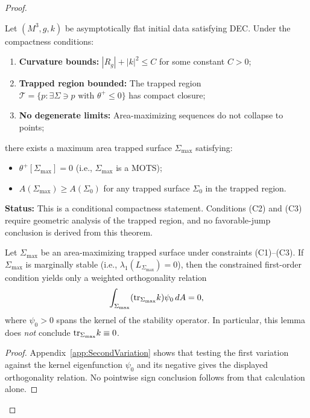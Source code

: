 \begin{proof}
\begin{theorem}\label{thm:MaxAreaTrapped}\label{rem:MaxAreaStatus}
Let $(M^3, g, k)$ be asymptotically flat initial data satisfying DEC. Under the compactness conditions:
\begin{enumerate}
    \item[\textup{(C1)}] \textbf{Curvature bounds:} $|R_g| + |k|^2 \le C$ for some constant $C > 0$;
    \item[\textup{(C2)}] \textbf{Trapped region bounded:} The trapped region $\mathcal{T} = \{p : \exists \Sigma \ni p \text{ with } \theta^+ \le 0\}$ has compact closure;
    \item[\textup{(C3)}] \textbf{No degenerate limits:} Area-maximizing sequences do not collapse to points;
\end{enumerate}
there exists a maximum area trapped surface $\Sigma_{\max}$ satisfying:
\begin{itemize}
    \item $\theta^+[\Sigma_{\max}] = 0$ (i.e., $\Sigma_{\max}$ is a MOTS);
    \item $A(\Sigma_{\max}) \ge A(\Sigma_0)$ for any trapped surface $\Sigma_0$ in the trapped region.
\end{itemize}
\textbf{Status:} This is a conditional compactness statement. Conditions (C2) and (C3) require geometric analysis of the trapped region, and no favorable-jump conclusion is derived from this theorem.
\end{theorem}

\begin{lemma}\label{lem:VanishingMultiplier}
Let $\Sigma_{\max}$ be an area-maximizing trapped surface under constraints (C1)--(C3). If $\Sigma_{\max}$ is marginally stable (i.e., $\lambda_1(L_{\Sigma_{\max}}) = 0$), then the constrained first-order condition yields only a weighted orthogonality relation
\[
    \int_{\Sigma_{\max}} (\mathrm{tr}_{\Sigma_{\max}} k)\psi_0\, dA = 0,
\]
where $\psi_0>0$ spans the kernel of the stability operator. In particular, this lemma does \emph{not} conclude $\mathrm{tr}_{\Sigma_{\max}} k \equiv 0$.
\end{lemma}
\begin{proof}
Appendix~\ref{app:SecondVariation} shows that testing the first variation against the kernel eigenfunction $\psi_0$ and its negative gives the displayed orthogonality relation. No pointwise sign conclusion follows from that calculation alone.
\end{proof}


\end{proof}
